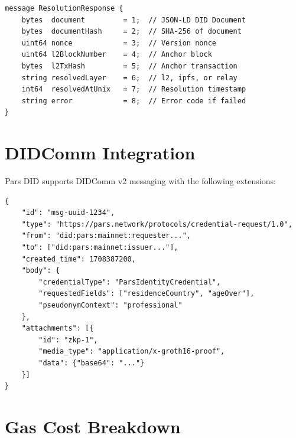 \documentclass[11pt,a4paper]{article}
\begin{document}
\begin{lstlisting}[language={},caption={Resolution response wire format}]
message ResolutionResponse {
    bytes  document         = 1;  // JSON-LD DID Document
    bytes  documentHash     = 2;  // SHA-256 of document
    uint64 nonce            = 3;  // Version nonce
    uint64 l2BlockNumber    = 4;  // Anchor block
    bytes  l2TxHash         = 5;  // Anchor transaction
    string resolvedLayer    = 6;  // l2, ipfs, or relay
    int64  resolvedAtUnix   = 7;  // Resolution timestamp
    string error            = 8;  // Error code if failed
}
\end{lstlisting}

\section{DIDComm Integration}
\label{app:didcomm}

Pars DID supports DIDComm v2 messaging with the following extensions:

\begin{lstlisting}[language={},caption={DIDComm message with Pars extensions}]
{
    "id": "msg-uuid-1234",
    "type": "https://pars.network/protocols/credential-request/1.0",
    "from": "did:pars:mainnet:requester...",
    "to": ["did:pars:mainnet:issuer..."],
    "created_time": 1708387200,
    "body": {
        "credentialType": "ParsIdentityCredential",
        "requestedFields": ["residenceCountry", "ageOver"],
        "pseudonymContext": "professional"
    },
    "attachments": [{
        "id": "zkp-1",
        "media_type": "application/x-groth16-proof",
        "data": {"base64": "..."}
    }]
}
\end{lstlisting}

\section{Gas Cost Breakdown}
\label{app:gas-costs}
\end{document}
